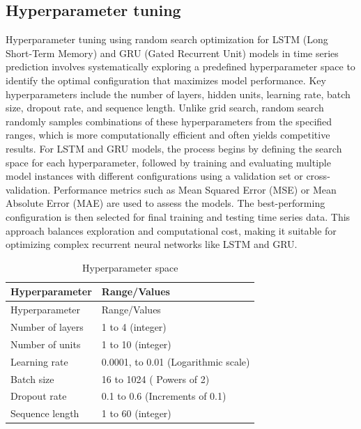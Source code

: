 \documentclass[]{interact}
\theoremstyle{plain}%
\theoremstyle{definition}
\theoremstyle{remark}
\begin{document}
\subsection{Hyperparameter tuning}\label{hyperparameter-tuning}

Hyperparameter tuning using random search optimization for LSTM (Long
Short-Term Memory) and GRU (Gated Recurrent Unit) models in time series
prediction involves systematically exploring a predefined hyperparameter
space to identify the optimal configuration that maximizes model
performance. Key hyperparameters include the number of layers, hidden
units, learning rate, batch size, dropout rate, and sequence length.
Unlike grid search, random search randomly samples combinations of these
hyperparameters from the specified ranges, which is more computationally
efficient and often yields competitive results. For LSTM and GRU models,
the process begins by defining the search space for each hyperparameter,
followed by training and evaluating multiple model instances with
different configurations using a validation set or cross-validation.
Performance metrics such as Mean Squared Error (MSE) or Mean Absolute
Error (MAE) are used to assess the models. The best-performing
configuration is then selected for final training and testing time
series data. This approach balances exploration and computational cost,
making it suitable for optimizing complex recurrent neural networks like
LSTM and GRU.

\begin{longtable}[]{@{}ll@{}}
\caption{Hyperparameter space}\tabularnewline
\toprule\noalign{}
Hyperparameter & Range/Values \\
\midrule\noalign{}
\endfirsthead
\toprule\noalign{}
Hyperparameter & Range/Values \\
\midrule\noalign{}
\endhead
\bottomrule\noalign{}
\endlastfoot
Number of layers & 1 to 4 (integer) \\
Number of units & 1 to 10 (integer) \\
Learning rate & 0.0001, to 0.01 (Logarithmic scale) \\
Batch size & 16 to 1024 ( Powers of 2) \\
Dropout rate & 0.1 to 0.6 (Increments of 0.1) \\
Sequence length & 1 to 60 (integer) \\
\end{longtable}
\end{document}
